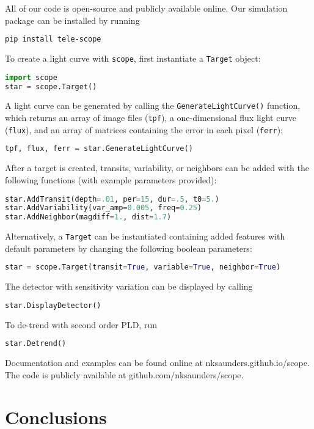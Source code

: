 \documentclass[12pt,preprint]{aastex}
\begin{document}
All of our code is open-source and publicly available online. Our simulation package can be installed by running
%
\begin{lstlisting}[language=bash]
pip install tele-scope
\end{lstlisting}
%
To create a light curve with \texttt{scope}, first instantiate a \texttt{Target} object:
%
\begin{lstlisting}[language=Python]
import scope
star = scope.Target()
\end{lstlisting}
%
A light curve can be generated by calling the \texttt{GenerateLightCurve()} function, which returns an array of image files (\texttt{tpf}), a one-dimensional flux light curve (\texttt{flux}), and an array of matrices containing the error in each pixel (\texttt{ferr}):
%
\begin{lstlisting}[language=Python]
tpf, flux, ferr = star.GenerateLightCurve()
\end{lstlisting}
%
After a target is created, transits, variability, or neighbors can be added with the following functions (with example parameters provided):
%
\begin{lstlisting}[language=Python]
star.AddTransit(depth=.01, per=15, dur=.5, t0=5.)
star.AddVariability(var_amp=0.005, freq=0.25)
star.AddNeighbor(magdiff=1., dist=1.7)
\end{lstlisting}
Alternatively, a \texttt{Target} can be instantiated containing added features with default parameters by changing the following boolean parameters:
%
\begin{lstlisting}[language=Python]
star = scope.Target(transit=True, variable=True, neighbor=True)
\end{lstlisting}
%
The detector with sensitivity variation can be displayed by calling
%
\begin{lstlisting}[language=Python]
star.DisplayDetector()
\end{lstlisting}
%
To de-trend with second order PLD, run
\begin{lstlisting}[language=Python]
star.Detrend()
\end{lstlisting}

Documentation and examples can be found online at nksaunders.github.io/scope. The code is publicly available at github.com/nksaunders/scope.

\section{Conclusions}
\end{document}
